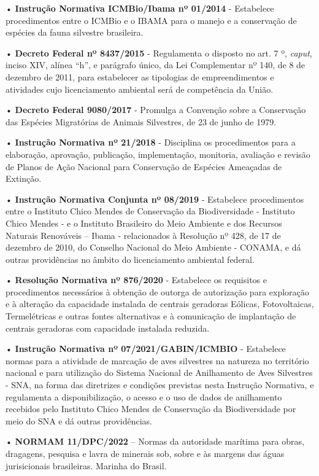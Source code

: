 \documentclass[
  oneside]{scrbook}
\begin{document}
• \textbf{Instrução Normativa ICMBio/Ibama nº 01/2014} - Estabelece procedimentos entre o ICMBio e o IBAMA para o manejo e a conservação de espécies da fauna silvestre brasileira.

• \textbf{Decreto Federal nº 8437/2015} - Regulamenta o disposto no art. 7 º, \emph{caput}, inciso XIV, alínea ``h'', e parágrafo único, da Lei Complementar nº 140, de 8 de dezembro de 2011, para estabelecer as tipologias de empreendimentos e atividades cujo licenciamento ambiental será de competência da União.

• \textbf{Decreto Federal 9080/2017} - Promulga a Convenção sobre a Conservação das Espécies Migratórias de Animais Silvestres, de 23 de junho de 1979.

• \textbf{Instrução Normativa nº 21/2018} - Disciplina os procedimentos para a elaboração, aprovação, publicação, implementação, monitoria, avaliação e revisão de Planos de Ação Nacional para Conservação de Espécies Ameaçadas de Extinção.

• \textbf{Instrução Normativa Conjunta nº 08/2019} - Estabelece procedimentos entre o Instituto Chico Mendes de Conservação da Biodiversidade - Instituto Chico Mendes - e o Instituto Brasileiro do Meio Ambiente e dos Recursos Naturais Renováveis -- Ibama - relacionados à Resolução nº 428, de 17 de dezembro de 2010, do Conselho Nacional do Meio Ambiente - CONAMA, e dá outras providências no âmbito do licenciamento ambiental federal.

• \textbf{Resolução Normativa nº 876/2020} - Estabelece os requisitos e procedimentos necessários à obtenção de outorga de autorização para exploração e à alteração da capacidade instalada de centrais geradoras Eólicas, Fotovoltaicas, Termelétricas e outras fontes alternativas e à comunicação de implantação de centrais geradoras com capacidade instalada reduzida.

• \textbf{Instrução Normativa nº 07/2021/GABIN/ICMBIO} - Estabelece normas para a atividade de marcação de aves silvestres na natureza no território nacional e para utilização do Sistema Nacional de Anilhamento de Aves Silvestres - SNA, na forma das diretrizes e condições previstas nesta Instrução Normativa, e regulamenta a disponibilização, o acesso e o uso de dados de anilhamento recebidos pelo Instituto Chico Mendes de Conservação da Biodiversidade por meio do SNA e dá outras providências.

• \textbf{NORMAM 11/DPC/2022} -- Normas da autoridade marítima para obras, dragagens, pesquisa e lavra de minerais sob, sobre e às margens das águas jurisicionais brasileiras. Marinha do Brasil.
\end{document}
